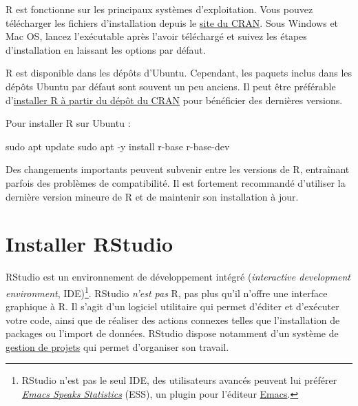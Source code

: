 \documentclass[
  french,
]{scrbook}
\newenvironment{Shaded}{\begin{snugshade}}{\end{snugshade}}
\newcommand{\AttributeTok}[1]{\textcolor[rgb]{0.77,0.63,0.00}{#1}}
\newcommand{\FunctionTok}[1]{\textcolor[rgb]{0.00,0.00,0.00}{#1}}
\newcommand{\NormalTok}[1]{#1}
\begin{document}
R est fonctionne sur les principaux systèmes d'exploitation. Vous pouvez télécharger les fichiers d'installation depuis le \href{https://cran.r-project.org/}{site du CRAN}. Sous Windows et Mac OS, lancez l'exécutable après l'avoir téléchargé et suivez les étapes d'installation en laissant les options par défaut.

R est disponible dans les dépôts d'Ubuntu. Cependant, les paquets inclus dans les dépôts Ubuntu par défaut sont souvent un peu anciens. Il peut être préférable d'\href{https://cran.r-project.org/bin/linux/ubuntu/fullREADME.html}{installer R à partir du dépôt du CRAN} pour bénéficier des dernières versions.

Pour installer R sur Ubuntu :

\begin{Shaded}
\begin{Highlighting}[]
\FunctionTok{sudo}\NormalTok{ apt update}
\FunctionTok{sudo}\NormalTok{ apt }\AttributeTok{{-}y}\NormalTok{ install r{-}base r{-}base{-}dev}
\end{Highlighting}
\end{Shaded}

\begin{tcolorbox}[fonttitle=\sffamily\bfseries\large,title=Important,colframe=darkgreen]

Des changements importants peuvent subvenir entre les versions de R, entraînant parfois des problèmes de compatibilité. Il est fortement recommandé d'utiliser la dernière version mineure de R et de maintenir son installation à jour.

\end{tcolorbox}

\hypertarget{rstudio-installation}{%
\section{Installer RStudio}\label{rstudio-installation}}

RStudio est un environnement de développement intégré (\emph{interactive development environment}, IDE)\footnote{RStudio n'est pas le seul IDE, des utilisateurs avancés peuvent lui préférer \href{https://ess.r-project.org/}{\emph{Emacs Speaks Statistics}} (ESS), un plugin pour l'éditeur \href{https://www.gnu.org/software/emacs/}{Emacs}.}. RStudio \emph{n'est pas} R, pas plus qu'il n'offre une interface graphique à R. Il s'agit d'un logiciel utilitaire qui permet d'éditer et d'exécuter votre code, ainsi que de réaliser des actions connexes telles que l'installation de packages ou l'import de données. RStudio dispose notamment d'un système de \protect\hyperlink{projets}{gestion de projets} qui permet d'organiser son travail.
\end{document}
